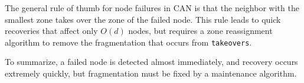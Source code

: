 The general rule of thumb for node failures in CAN is that the neighbor with the smallest zone takes over the zone of the failed node.
This rule leads to quick recoveries that affect only $O(d)$ nodes, but requires a zone reassignment algorithm to remove the fragmentation that occurs from \texttt{takeovers}.

To summarize, a failed node is detected almost immediately, and recovery occurs extremely quickly, but fragmentation must be fixed by a maintenance algorithm.















